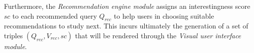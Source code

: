 Furthermore, the \emph{Recommendation engine module} assigns an interestingness score $sc$ to each recommended query $Q_{rec}$ to help users in choosing suitable recommendations to study next. 
This incurs ultimately the generation of a set of triples $(Q_{rec},V_{rec},sc)$ that will be rendered through the \emph{Visual user interface module}.











